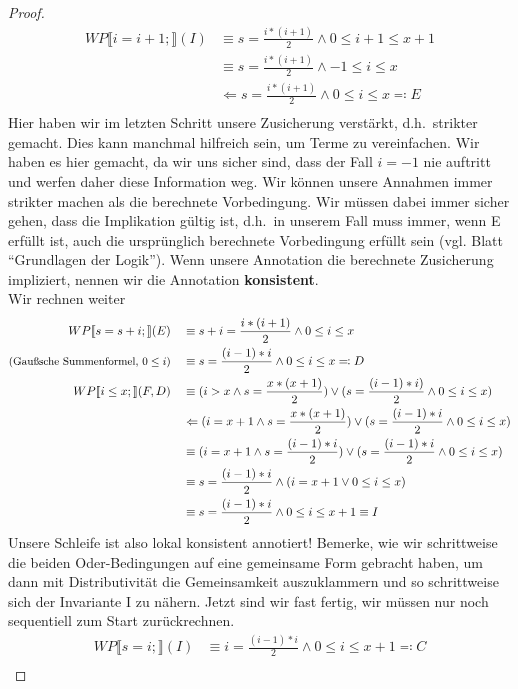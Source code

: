 \documentclass[hidelinks]{article}
\theoremstyle{plain}
\theoremstyle{definition}
\theoremstyle{rem}
\begin{document}
\begin{sloppypar}
\begin{proof}
\begin{align*}
WP\llbracket i=i+1;\rrbracket(I)&\equiv s=\frac{i*(i+1)}{2}\wedge 0\le i+1\le x+1\\
&\equiv s=\frac{i*(i+1)}{2}\wedge -1\le i\le x\\
&\Leftarrow s=\frac{i*(i+1)}{2}\wedge 0\le i\le x\eqqcolon E\\
\end{align*}
Hier haben wir im letzten Schritt unsere Zusicherung verstärkt, d.h.\ strikter gemacht. Dies kann manchmal hilfreich sein, um Terme zu vereinfachen. Wir haben es hier gemacht, da wir uns sicher sind, dass der Fall $i=-1$ nie auftritt und werfen daher diese Information weg. Wir können unsere Annahmen immer strikter machen als die berechnete Vorbedingung. Wir müssen dabei immer sicher gehen, dass die Implikation gültig ist, d.h.\ in unserem Fall muss immer, wenn E erfüllt ist, auch die ursprünglich berechnete Vorbedingung erfüllt sein (vgl. Blatt ``Grundlagen der Logik''). Wenn unsere Annotation die berechnete Zusicherung impliziert, nennen wir die Annotation \textbf{konsistent}.\\
Wir rechnen weiter
\begin{align*}
WP\llbracket s=s+i;\rrbracket(E)\quad&\equiv s+i=\frac{i*(i+1)}{2}\wedge 0\le i\le x\\
\text{\small{(Gaußsche Summenformel, $0\le i$)}}\quad&\equiv s=\frac{(i-1)*i}{2}\wedge 0\le i\le x\eqqcolon D\\
WP\llbracket i\le x;\rrbracket(F,D)\quad&\equiv (i>x \wedge s=\frac{x*(x+1)}{2})\vee (s=\frac{(i-1)*i)}{2}\wedge 0\le i\le x)\\
&\Leftarrow (i=x+1 \wedge s=\frac{x*(x+1)}{2})\vee (s=\frac{(i-1)*i}{2}\wedge 0\le i\le x)\\
&\equiv (i=x+1 \wedge s=\frac{(i-1)*i}{2})\vee (s=\frac{(i-1)*i}{2}\wedge 0\le i\le x)\\
&\equiv s=\frac{(i-1)*i}{2}\wedge(i=x+1 \vee 0\le i\le x)\\
&\equiv s=\frac{(i-1)*i}{2}\wedge 0\le i\le x+1\equiv I
\end{align*}
Unsere Schleife ist also lokal konsistent annotiert! Bemerke, wie wir schrittweise die beiden Oder-Bedingungen auf eine gemeinsame Form gebracht haben, um dann mit Distributivität die Gemeinsamkeit auszuklammern und so schrittweise sich der Invariante I zu nähern. Jetzt sind wir fast fertig, wir müssen nur noch sequentiell zum Start zurückrechnen.
\begin{align*}
WP\llbracket s=i;\rrbracket(I)&\equiv i=\frac{(i-1)*i}{2}\wedge 0\le i\le x+1\eqqcolon C\\

\end{align*}
\end{proof}
\end{sloppypar}
\end{document}

